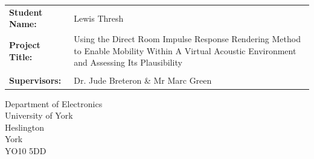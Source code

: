 \begin{titlepage}
	\vfill
	
	\Large
	\begin{tabu}{l X[l]}
		\textbf{Student Name:} & Lewis Thresh\\
		\textbf{Project Title:} &Using the Direct Room Impulse Response Rendering Method to Enable Mobility Within A Virtual Acoustic Environment and Assessing Its Plausibility\\
		&\\[-8mm]
		\textbf{Supervisors:} & Dr. Jude Breteron \& Mr Marc Green
	\end{tabu}
	
	\vfill
	
	\begin{center}
		\small
		Department of Electronics\\University of York\\Heslington\\York\\YO10 5DD
	\end{center}



	
\end{titlepage}